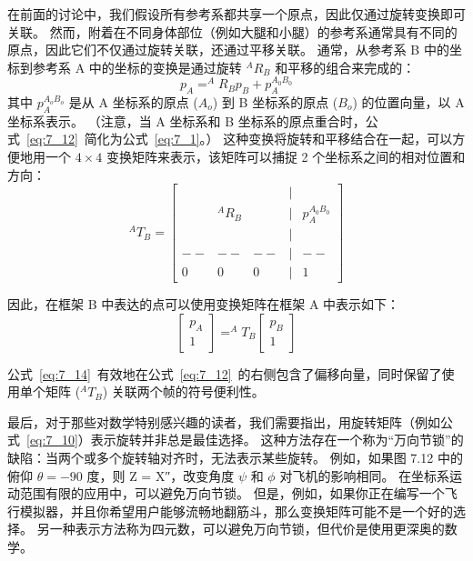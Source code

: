 在前面的讨论中，我们假设所有参考系都共享一个原点，因此仅通过旋转变换即可关联。
然而，附着在不同身体部位（例如大腿和小腿）的参考系通常具有不同的原点，因此它们不仅通过旋转关联，还通过平移关联。
通常，从参考系 B 中的坐标到参考系 A 中的坐标的变换是通过旋转 $^AR_B$ 和平移的组合来完成的：
%
\begin{equation}
	p_A = ^A R_B p_B + p_A^{A_0 B_0}
	\label{eq:7_12}
\end{equation}
%
其中 $p_A ^{A_o B_o}$ 是从 A 坐标系的原点 ($A_o$) 到 B 坐标系的原点 ($B_o$) 的位置向量，以 A 坐标系表示。
（注意，当 A 坐标系和 B 坐标系的原点重合时，公式~\ref{eq:7_12}~简化为公式~\ref{eq:7_1}。）
这种变换将旋转和平移结合在一起，可以方便地用一个 $4 \times 4$ 变换矩阵来表示，该矩阵可以捕捉 2 个坐标系之间的相对位置和方向：
\begin{equation}
	^A T_B = 
	\begin{bmatrix}
		& & & | & \\
		& ^A R_B & & | & p_A ^{A_0 B_0} \\
		& & & | & \\
		--& -- & -- & | & -- \\
		0 & 0 & 0 & | & 1
	\end{bmatrix}
	\label{eq:5_13}
\end{equation}


因此，在框架 B 中表达的点可以使用变换矩阵在框架 A 中表示如下：
%
\begin{equation}
	\begin{bmatrix}
		p_A \\
		1
	\end{bmatrix}
	=
	^A T_B
	\begin{bmatrix}
		p_B \\
		1
	\end{bmatrix}
	\label{eq:7_14}
\end{equation}

公式~\ref{eq:7_14}~有效地在公式~\ref{eq:7_12}~的右侧包含了偏移向量，同时保留了使用单个矩阵 ($^AT_B$) 关联两个帧的符号便利性。



最后，对于那些对数学特别感兴趣的读者，我们需要指出，用旋转矩阵（例如公式~\ref{eq:7_10}）表示旋转并非总是最佳选择。
这种方法存在一个称为“万向节锁”的缺陷：当两个或多个旋转轴对齐时，无法表示某些旋转。
例如，如果图 7.12 中的俯仰 $\theta = −90$ 度，则 Z = X″，改变角度 $\psi$ 和 $\phi$ 对飞机的影响相同。
在坐标系运动范围有限的应用中，可以避免万向节锁。
但是，例如，如果你正在编写一个飞行模拟器，并且你希望用户能够流畅地翻筋斗，那么变换矩阵可能不是一个好的选择。
另一种表示方法称为四元数，可以避免万向节锁，但代价是使用更深奥的数学。


